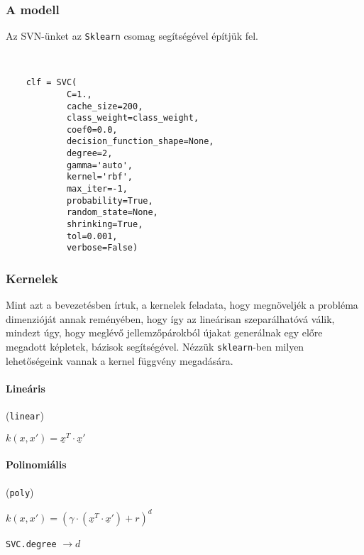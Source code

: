\subsubsection{A modell}

Az SVN-ünket az \texttt{Sklearn} csomag segítségével építjük fel. 


\begin{lstlisting}  


	clf = SVC(
			C=1., 
			cache_size=200, 
			class_weight=class_weight, 
			coef0=0.0,
			decision_function_shape=None, 
			degree=2, 
			gamma='auto', 
			kernel='rbf',
			max_iter=-1,
			probability=True, 
			random_state=None, 
			shrinking=True,
			tol=0.001, 
			verbose=False)

\end{lstlisting}




\subsubsection{Kernelek}


Mint azt a bevezetésben írtuk, a kernelek feladata, hogy megnöveljék a probléma
dimenzióját annak reményében, hogy így az lineárisan szeparálhatóvá válik, mindezt 
úgy, hogy meglévő jellemzőpárokból újakat generálnak egy előre megadott képletek,
bázisok segítségével. Nézzük \texttt{sklearn}-ben milyen lehetőségeink vannak a 
kernel függvény megadására.


\paragraph{Lineáris} (\texttt{linear})

$ k(x, x') = \underline{x}^T \cdot \underline{x}' $


\paragraph{Polinomiális} (\texttt{poly})

$ k(x, x') = (\gamma \cdot (\underline{x}^T \cdot \underline{x}') + r)^d $

\texttt{SVC.degree} $ \rightarrow d $


